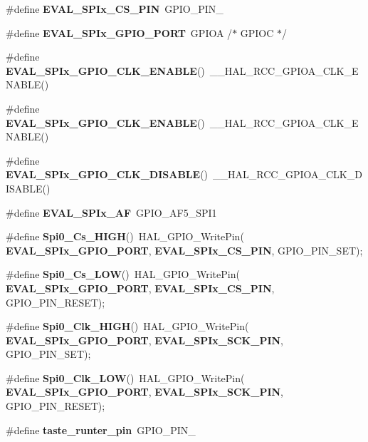 \begin{DoxyCompactItemize}
\#define \textbf{ E\+V\+A\+L\+\_\+\+S\+P\+Ix\+\_\+\+C\+S\+\_\+\+P\+IN}~G\+P\+I\+O\+\_\+\+P\+I\+N\+\_
\item 
\#define \textbf{ E\+V\+A\+L\+\_\+\+S\+P\+Ix\+\_\+\+G\+P\+I\+O\+\_\+\+P\+O\+RT}~G\+P\+I\+OA                        /$\ast$ G\+P\+I\+OC $\ast$/
\item 
\#define \textbf{ E\+V\+A\+L\+\_\+\+S\+P\+Ix\+\_\+\+G\+P\+I\+O\+\_\+\+C\+L\+K\+\_\+\+E\+N\+A\+B\+LE}()~\+\_\+\+\_\+\+H\+A\+L\+\_\+\+R\+C\+C\+\_\+\+G\+P\+I\+O\+A\+\_\+\+C\+L\+K\+\_\+\+E\+N\+A\+B\+LE()
\item 
\#define \textbf{ E\+V\+A\+L\+\_\+\+S\+P\+Ix\+\_\+\+G\+P\+I\+O\+\_\+\+C\+L\+K\+\_\+\+E\+N\+A\+B\+LE}()~\+\_\+\+\_\+\+H\+A\+L\+\_\+\+R\+C\+C\+\_\+\+G\+P\+I\+O\+A\+\_\+\+C\+L\+K\+\_\+\+E\+N\+A\+B\+LE()
\item 
\#define \textbf{ E\+V\+A\+L\+\_\+\+S\+P\+Ix\+\_\+\+G\+P\+I\+O\+\_\+\+C\+L\+K\+\_\+\+D\+I\+S\+A\+B\+LE}()~\+\_\+\+\_\+\+H\+A\+L\+\_\+\+R\+C\+C\+\_\+\+G\+P\+I\+O\+A\+\_\+\+C\+L\+K\+\_\+\+D\+I\+S\+A\+B\+LE()
\item 
\#define \textbf{ E\+V\+A\+L\+\_\+\+S\+P\+Ix\+\_\+\+AF}~G\+P\+I\+O\+\_\+\+A\+F5\+\_\+\+S\+P\+I1
\item 
\#define \textbf{ Spi0\+\_\+\+Cs\+\_\+\+H\+I\+GH}()~H\+A\+L\+\_\+\+G\+P\+I\+O\+\_\+\+Write\+Pin(\textbf{ E\+V\+A\+L\+\_\+\+S\+P\+Ix\+\_\+\+G\+P\+I\+O\+\_\+\+P\+O\+RT},\textbf{ E\+V\+A\+L\+\_\+\+S\+P\+Ix\+\_\+\+C\+S\+\_\+\+P\+IN}, G\+P\+I\+O\+\_\+\+P\+I\+N\+\_\+\+S\+ET);
\item 
\#define \textbf{ Spi0\+\_\+\+Cs\+\_\+\+L\+OW}()~H\+A\+L\+\_\+\+G\+P\+I\+O\+\_\+\+Write\+Pin(\textbf{ E\+V\+A\+L\+\_\+\+S\+P\+Ix\+\_\+\+G\+P\+I\+O\+\_\+\+P\+O\+RT},\textbf{ E\+V\+A\+L\+\_\+\+S\+P\+Ix\+\_\+\+C\+S\+\_\+\+P\+IN}, G\+P\+I\+O\+\_\+\+P\+I\+N\+\_\+\+R\+E\+S\+ET);
\item 
\#define \textbf{ Spi0\+\_\+\+Clk\+\_\+\+H\+I\+GH}()~H\+A\+L\+\_\+\+G\+P\+I\+O\+\_\+\+Write\+Pin(\textbf{ E\+V\+A\+L\+\_\+\+S\+P\+Ix\+\_\+\+G\+P\+I\+O\+\_\+\+P\+O\+RT},\textbf{ E\+V\+A\+L\+\_\+\+S\+P\+Ix\+\_\+\+S\+C\+K\+\_\+\+P\+IN}, G\+P\+I\+O\+\_\+\+P\+I\+N\+\_\+\+S\+ET);
\item 
\#define \textbf{ Spi0\+\_\+\+Clk\+\_\+\+L\+OW}()~H\+A\+L\+\_\+\+G\+P\+I\+O\+\_\+\+Write\+Pin(\textbf{ E\+V\+A\+L\+\_\+\+S\+P\+Ix\+\_\+\+G\+P\+I\+O\+\_\+\+P\+O\+RT},\textbf{ E\+V\+A\+L\+\_\+\+S\+P\+Ix\+\_\+\+S\+C\+K\+\_\+\+P\+IN}, G\+P\+I\+O\+\_\+\+P\+I\+N\+\_\+\+R\+E\+S\+ET);
\item 
\#define \textbf{ taste\+\_\+runter\+\_\+pin}~G\+P\+I\+O\+\_\+\+P\+I\+N\+\_
\item 

\end{DoxyCompactItemize}
